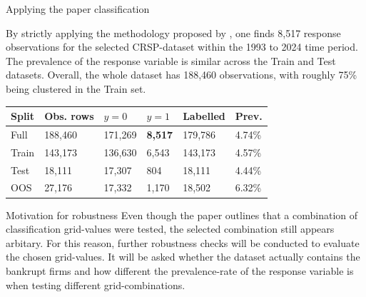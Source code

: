 \documentclass[10pt]{beamer}\usepackage[]{graphicx}\usepackage[table]{xcolor}
\begin{document}
\begin{frame}{Applying the paper classification}

\small
By strictly applying the methodology proposed by \citet{Tewari2024},
one finds 8,517 response observations for the selected CRSP-dataset within the 1993 to 2024
time period. The prevalence of the response variable is similar across the Train and
Test datasets. Overall, the whole dataset has 188,460 observations, with roughly
75\% being clustered in the Train set.


\vspace{0.2em}
\begin{table}[ht]
\centering
\scriptsize
\setlength{\tabcolsep}{4.4pt}
\begin{tabular}{L{1.7cm}R{1.25cm}R{1.1cm}R{1.1cm}R{1.25cm}R{1.0cm}}
\toprule
Split & Obs. rows & $y=0$ & $y=1$ & Labelled & Prev. \\
\midrule
Full & 188,460 & 171,269 & \textbf{8,517} & 179,786 & 4.74\% \\
Train & 143,173 & 136,630 & 6,543 & 143,173 & 4.57\% \\
Test & 18,111 & 17,307 & 804 & 18,111 & 4.44\% \\
OOS & 27,176 & 17,332 & 1,170 & 18,502 & 6.32\% \\
\bottomrule
\end{tabular}
\end{table}

\vspace{0.15em}
\begin{alertblock}{Motivation for robustness}
\scriptsize
Even though the paper outlines that a combination of classification grid-values were tested,
the selected combination still appears arbitary. For this reason, further robustness checks
will be conducted to evaluate the chosen grid-values. It will be asked whether the dataset actually contains
the bankrupt firms and how different the prevalence-rate of the response variable is when testing different
grid-combinations.
\end{alertblock}
\end{frame}

\end{document}
